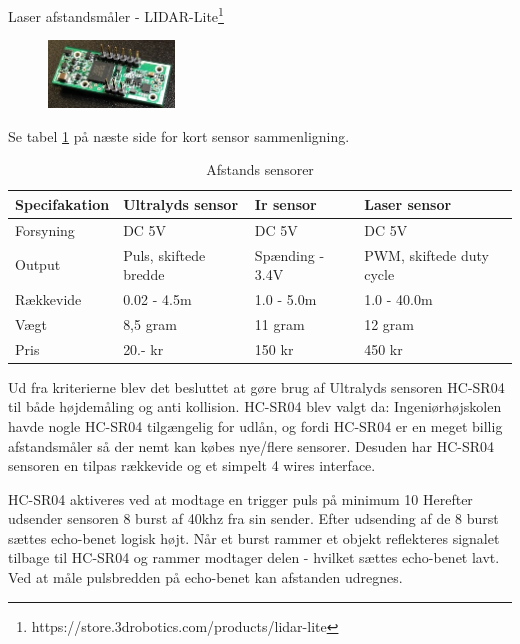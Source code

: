 Laser afstandsmåler - LIDAR-Lite\footnote{https://store.3drobotics.com/products/lidar-lite}
\begin{figure}[H]
\centering
\includegraphics[width=0.3\textwidth]{Billeder/Afstandsmaler/laser_sensor.png}
\label{fig:laser_sensor}
\end{figure}

Se tabel \ref{tab:Afstands_sensorer} på næste side for kort sensor sammenligning.

\raggedright
\newpage

\begin{table}[H]
	\centering
		\begin{tabular}{|p{2.8cm}|p{3.4 cm}|p{3.4 cm}|p{3.4 cm}|} 
		\hline
			\textbf{Specifakation} 	& \textbf{Ultralyds sensor} 	& \textbf{Ir sensor} 		& \textbf{Laser sensor} \\ \hline
			 Forsyning 				& DC 5V 						& DC 5V 					& DC 5V \\ \hline			 
			 Output 				& Puls, \newline skiftede bredde 		& Spænding \newline 1.4 - 3.4V 		& PWM, \newline skiftede duty cycle\\ \hline
			 Rækkevide 					& 0.02 - 4.5m 					& 1.0 - 5.0m 				& 1.0 - 40.0m \\ \hline
			 Vægt 					& 8,5 gram 						& 11 gram 					& 12 gram \\ \hline
		 	 Pris 					& 20.- kr 						& 150 kr 					& 450 kr \\ \hline			 
		\end{tabular}
	\caption{Afstands sensorer}
	\label{tab:Afstands_sensorer}
\end{table}

\vspace{1cm}

Ud fra kriterierne blev det besluttet at gøre brug af Ultralyds sensoren HC-SR04 til både højdemåling og anti kollision. HC-SR04 blev valgt da: Ingeniørhøjskolen havde nogle HC-SR04 tilgængelig for udlån, og fordi HC-SR04 er en meget billig afstandsmåler så der nemt kan købes nye/flere sensorer. Desuden har HC-SR04 sensoren en tilpas rækkevide og et simpelt 4 wires interface. 

HC-SR04 aktiveres ved at modtage en trigger puls på minimum 10 
Herefter udsender sensoren 8 burst af 40khz fra sin sender. Efter udsending af de 8 burst sættes echo-benet logisk højt. Når et burst rammer et objekt reflekteres signalet tilbage til HC-SR04 og rammer modtager delen - hvilket sættes echo-benet lavt. Ved at måle pulsbredden på echo-benet kan afstanden udregnes. 

